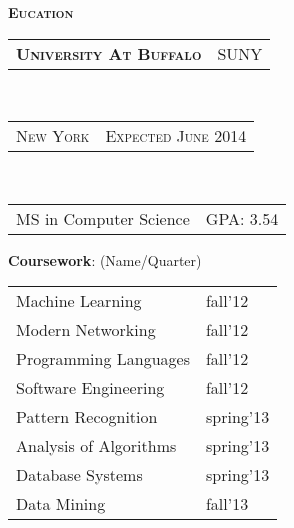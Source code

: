 \documentclass[10pt,a4paper,oneside]{article}
\begin{document}
    \begin{minipage}[t]{0.33\textwidth}
        \vspace{0pt}
        \textcolor{light-gray}{\textbf{\large E\textsc{ucation}}}
        \vspace{10pt}\\
        \begin{tabular}{c|c}
            \textbf{\normalsize U\textsc{niversity} A\textsc{t} B\textsc{uffalo}}
            &\textmd{\normalsize SUNY}
        \end{tabular}\\
        \textcolor{light-gray}{
            \begin{tabular}{c|c}
                {\small N\textsc{ew} Y\textsc{ork}}
                &{\small E\textsc{xpected} J\textsc{une} 2014}
            \end{tabular}
        }\\ 
        \begin{tabular}{c|c}
            {\small MS in Computer Science}
            &{\small GPA: 3.54}
        \end{tabular}
        \vspace{0pt}
        \begin{adjustwidth}{7pt}{0pt}
            {\small \textbf{Coursework}: (Name/Quarter)}\\
        \end{adjustwidth}
        \vspace{-11pt}
        \begin{adjustwidth}{7pt}{0pt}
            \begin{tabular}{ll}
                { \footnotesize Machine Learning } & {\small fall'12}\\                
                { \footnotesize Modern Networking } & {\small fall'12}\\
                { \footnotesize Programming Languages } & {\small fall'12}\\
                { \footnotesize Software Engineering } & {\small fall'12}\\
                { \footnotesize Pattern Recognition } & {\footnotesize spring'13}\\
                { \footnotesize Analysis of Algorithms } & {\footnotesize spring'13}\\
                { \footnotesize Database Systems } & {\footnotesize spring'13}\\
                { \footnotesize Data Mining } & {\footnotesize fall'13}\\

\end{tabular}
\end{adjustwidth}
\end{minipage}
\end{document}
